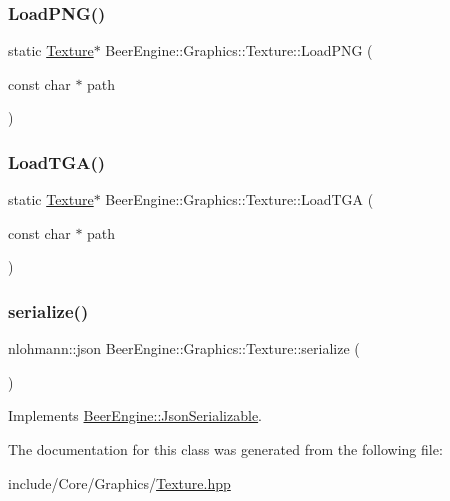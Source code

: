 \subsubsection{\texorpdfstring{Load\+P\+N\+G()}{LoadPNG()}}
{\footnotesize\ttfamily static \mbox{\hyperlink{class_beer_engine_1_1_graphics_1_1_texture}{Texture}}$\ast$ Beer\+Engine\+::\+Graphics\+::\+Texture\+::\+Load\+P\+NG (\begin{DoxyParamCaption}\item[{const char $\ast$}]{path }\end{DoxyParamCaption})\hspace{0.3cm}{\ttfamily [static]}}

\mbox{\label{class_beer_engine_1_1_graphics_1_1_texture_a57210a6e3dfc7cedc814c76753ba387e}} 
\subsubsection{\texorpdfstring{Load\+T\+G\+A()}{LoadTGA()}}
{\footnotesize\ttfamily static \mbox{\hyperlink{class_beer_engine_1_1_graphics_1_1_texture}{Texture}}$\ast$ Beer\+Engine\+::\+Graphics\+::\+Texture\+::\+Load\+T\+GA (\begin{DoxyParamCaption}\item[{const char $\ast$}]{path }\end{DoxyParamCaption})\hspace{0.3cm}{\ttfamily [static]}}

\mbox{\label{class_beer_engine_1_1_graphics_1_1_texture_acb81c7ded6c7be42b0e901dd57dc8785}} 
\subsubsection{\texorpdfstring{serialize()}{serialize()}}
{\footnotesize\ttfamily nlohmann\+::json Beer\+Engine\+::\+Graphics\+::\+Texture\+::serialize (\begin{DoxyParamCaption}{ }\end{DoxyParamCaption})\hspace{0.3cm}{\ttfamily [virtual]}}



Implements \mbox{\hyperlink{class_beer_engine_1_1_json_serializable_a17689cbd8fe282c570bd026cc1be5b3b}{Beer\+Engine\+::\+Json\+Serializable}}.



The documentation for this class was generated from the following file\+:\begin{DoxyCompactItemize}
\item 
include/\+Core/\+Graphics/\mbox{\hyperlink{_texture_8hpp}{Texture.\+hpp}}\end{DoxyCompactItemize}
